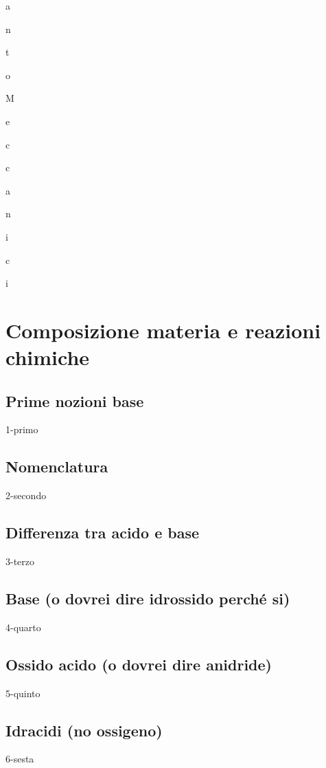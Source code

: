 \documentclass[openany,12pt]{book}%
\newcommand\blankpage{%
    \null
    \thispagestyle{empty}%
    \newpage}
\newcommand{\comment}[1]{}
\begin{document}
a

n

t

o

\vspace{0.2cm}
M

e

c

c

a

n

i

c

i

\afterpage{\blankpage}
\newpage

\chapter{Composizione materia e reazioni chimiche}

\section{Prime nozioni base}%
{1-primo}

\newpage

\section{Nomenclatura}
{2-secondo}

\section{Differenza tra acido e base}
{3-terzo}

\section{Base (o dovrei dire idrossido perché si)}
{4-quarto}

\section{Ossido acido (o dovrei dire anidride)}
{5-quinto}

\section{Idracidi (no ossigeno)}
{6-sesta}
\end{document}
